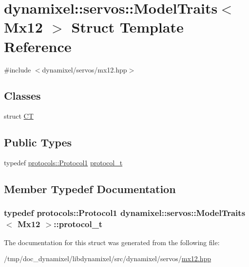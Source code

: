 \hypertarget{structdynamixel_1_1servos_1_1_model_traits_3_01_mx12_01_4}{}\section{dynamixel\+:\+:servos\+:\+:Model\+Traits$<$ Mx12 $>$ Struct Template Reference}
\label{structdynamixel_1_1servos_1_1_model_traits_3_01_mx12_01_4}


{\ttfamily \#include $<$dynamixel/servos/mx12.\+hpp$>$}

\subsection*{Classes}
\begin{DoxyCompactItemize}
\item 
struct \hyperlink{structdynamixel_1_1servos_1_1_model_traits_3_01_mx12_01_4_1_1_c_t}{CT}
\end{DoxyCompactItemize}
\subsection*{Public Types}
\begin{DoxyCompactItemize}
\item 
typedef \hyperlink{classdynamixel_1_1protocols_1_1_protocol1}{protocols\+::\+Protocol1} \hyperlink{structdynamixel_1_1servos_1_1_model_traits_3_01_mx12_01_4_a6bf24d609897d873140d1842e725fd47}{protocol\+\_\+t}
\end{DoxyCompactItemize}


\subsection{Member Typedef Documentation}
\subsubsection[{\texorpdfstring{protocol\+\_\+t}{protocol_t}}]{\setlength{\rightskip}{0pt plus 5cm}typedef {\bf protocols\+::\+Protocol1} {\bf dynamixel\+::servos\+::\+Model\+Traits}$<$ {\bf Mx12} $>$\+::{\bf protocol\+\_\+t}}\hypertarget{structdynamixel_1_1servos_1_1_model_traits_3_01_mx12_01_4_a6bf24d609897d873140d1842e725fd47}{}\label{structdynamixel_1_1servos_1_1_model_traits_3_01_mx12_01_4_a6bf24d609897d873140d1842e725fd47}


The documentation for this struct was generated from the following file\+:\begin{DoxyCompactItemize}
\item 
/tmp/doc\+\_\+dynamixel/libdynamixel/src/dynamixel/servos/\hyperlink{mx12_8hpp}{mx12.\+hpp}\end{DoxyCompactItemize}
